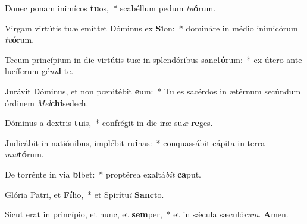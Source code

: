 \item Donec ponam inimícos \textbf{tu}os,~* scabéllum pedum \textit{tu}\textbf{ó}rum.

\item Virgam virtútis tuæ emíttet Dóminus ex \textbf{Si}on:~* domináre in médio inimicórum \textit{tu}\textbf{ó}rum.

\item Tecum princípium in die virtútis tuæ in splendóribus sanc\textbf{tó}rum:~* ex útero ante lucíferum gé\textit{nu}\textbf{i} te.

\item Jurávit Dóminus, et non pœnitébit \textbf{e}um:~* Tu es sacérdos in ætérnum secúndum órdinem \textit{Mel}\textbf{chí}sedech.

\item Dóminus a dextris \textbf{tu}is,~* confrégit in die iræ su\textit{æ} \textbf{re}ges.

\item Judicábit in natiónibus, implébit ru\textbf{í}nas:~* conquassábit cápita in terra \textit{mul}\textbf{tó}rum.

\item De torrénte in via \textbf{bi}bet:~* proptérea exaltá\textit{bit} \textbf{ca}put.

\item Glória Patri, et \textbf{Fí}lio,~* et Spirítu\textit{i} \textbf{Sanc}to.

\item Sicut erat in princípio, et nunc, et \textbf{sem}per,~* et in sǽcula sæculó\textit{rum}. \textbf{A}men.
